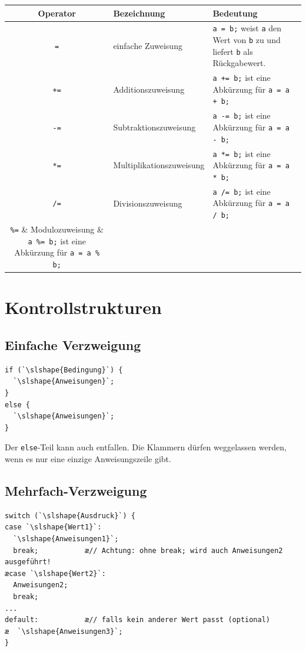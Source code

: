 \begin{tabular}{|c|l|l|}\hline
\textbf{Operator} & \textbf{Bezeichnung} & \textbf{Bedeutung}
\\ \hline
{\lstinline|=|} & einfache Zuweisung & {\lstinline|a = b;|} weist
{\lstinline|a|} den Wert von {\lstinline|b|} zu und liefert {\lstinline|b|} als
Rückgabewert.
\\ \hline
{\lstinline|+=|} & Additionszuweisung & {\lstinline|a += b;|} ist eine Abkürzung
für {\lstinline|a = a + b;|}
\\ \hline
{\lstinline|-=|} & Subtraktionszuweisung & {\lstinline|a -= b;|} ist eine
Abkürzung für {\lstinline|a = a - b;|} 
\\ \hline
{\lstinline|*=|} & Multiplikationszuweisung & {\lstinline|a *= b;|} ist
eine Abkürzung für {\lstinline|a = a * b;|}
\\ \hline
{\lstinline|/=|} & Divisionszuweisung & {\lstinline|a /= b;|} ist
eine Abkürzung für {\lstinline|a = a / b;|}
\\ \hline
{\lstinline|%=|} & Modulozuweisung & {\lstinline|a %= b;|} ist eine Abkürzung
für {\lstinline|a = a % b;|}
\\ \hline
\end{tabular}


\section{Kontrollstrukturen}

\subsection{Einfache Verzweigung}

\begin{lstlisting}
if (`\slshape{Bedingung}`) {
  `\slshape{Anweisungen}`;
}
else {
  `\slshape{Anweisungen}`;
}
\end{lstlisting}

Der \lstinline|else|-Teil kann auch entfallen. Die Klammern dürfen weggelassen
werden, wenn es nur eine einzige Anweisungszeile gibt.


\subsection{Mehrfach-Verzweigung}

\begin{lstlisting}
switch (`\slshape{Ausdruck}`) {
case `\slshape{Wert1}`:
  `\slshape{Anweisungen1}`;
  break;           æ// Achtung: ohne break; wird auch Anweisungen2 ausgeführt!
æcase `\slshape{Wert2}`:
  Anweisungen2;
  break;
...
default:           æ// falls kein anderer Wert passt (optional)
æ  `\slshape{Anweisungen3}`;
}
\end{lstlisting}


